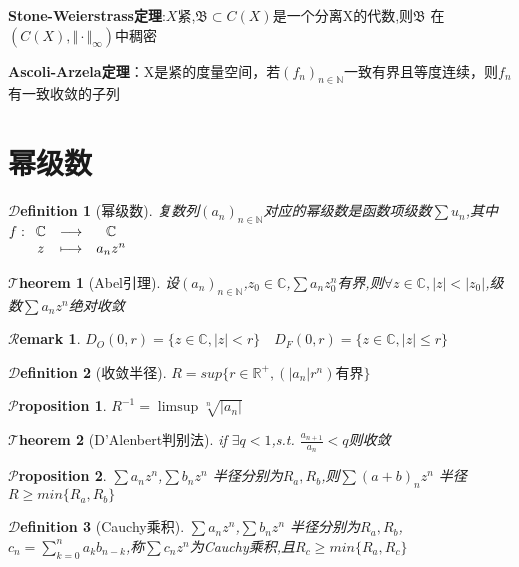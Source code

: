 \documentclass[hyperfer,UTF8,a4paper,12pt]{article}
\theoremstyle{plain}
\newtheorem{Thm}{$\mathcal{T}$heorem}
\newtheorem*{Prop}{$\mathcal{P}$roposition}
\newtheorem*{Remark}{$\mathcal{R}$emark}
\newtheorem{Def}{{$\mathcal{D}$efinition}}[section]
\begin{document}
\textbf{Stone-Weierstrass定理}:$X紧$,$ \mathfrak{B}\subset C(X)$是一个分离X的代数,则$ \mathfrak{B} $ 在$ (C(X),\Vert\cdot\Vert_\infty) $中稠密

\textbf{Ascoli-Arzela定理}：X是紧的度量空间，若$ (f_n)_{n\in\mathbb{N}} $一致有界且等度连续，则$ f_n $有一致收敛的子列

\section{幂级数}
\begin{Def}[幂级数]
	复数列$ (a_n)_{n\in\mathbb{N}} $对应的幂级数是函数项级数$ \sum\limits u_n $,其中$f:\begin{array}[t]{ccc}\mathbb{C} &\longrightarrow &\mathbb{C}\\ z &\longmapsto&a_nz^n\end{array} $
\end{Def}

\begin{Thm}[Abel引理]
	设$ (a_n)_{n\in\mathbb{N}} $,$ z_0\in\mathbb{C} $,$ \sum a_nz_0^n $有界,则$ \forall z\in\mathbb{C},|z|<|z_0| $,级数$ \sum a_nz^n $绝对收敛
\end{Thm}

\begin{Remark}
	$ D_O(0,r)=\{ z\in\mathbb{C} , |z|<r \} $$ \quad $$ D_F(0,r)=\{ z\in\mathbb{C} , |z|\leqslant r \} $
\end{Remark}
\begin{Def}[收敛半径]
	$R=sup\{ r\in\mathbb{R}^+,(|a_n|r^n)\textrm{有界} \}$
\end{Def}

\begin{Prop}
	$ R^{-1}=\limsup\sqrt[n]{|a_n|} $
\end{Prop}

\begin{Thm}[D'Alenbert判别法]
	if $ \exists q<1 $,s.t. $ \frac{a_{n+1}}{a_n}<q $则收敛
\end{Thm}


\begin{Prop}
	$ \sum a_nz^n $,$ \sum b_nz^n $ 半径分别为$ R_a,R_b $,则$ \sum (a+b)_nz^n $ 半径$ R\geqslant min\{R_a,R_b\} $
\end{Prop}

\begin{Def}[Cauchy乘积]
	$ \sum a_nz^n $,$ \sum b_nz^n $ 半径分别为$ R_a,R_b$,$ c_n=\sum\limits_{k=0}^n a_kb_{n-k} $,称$ \sum c_nz^n $为Cauchy乘积,且$ R_c\geqslant min\{R_a,R_c\} $
\end{Def}
\end{document}
